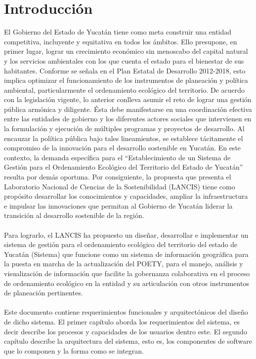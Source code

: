 \section{Introducción}

El Gobierno del Estado de Yucatán tiene como meta construir una entidad competitiva, incluyente
y equitativa en todos los ámbitos. Ello presupone, en primer lugar, lograr un crecimiento
económico sin menoscabo del capital natural y los servicios ambientales con los que cuenta el
estado para el bienestar de sus habitantes. Conforme se señala en el Plan Estatal de Desarrollo
2012-2018, esto implica optimizar el funcionamiento de los instrumentos de planeación y política
ambiental, particularmente el ordenamiento ecológico del territorio. De acuerdo con la legislación
vigente, lo anterior conlleva asumir el reto de lograr una gestión pública armónica y diligente. Ésta
debe manifestarse en una coordinación efectiva entre las entidades de gobierno y los diferentes
actores sociales que intervienen en la formulación y ejecución de múltiples programas y proyectos
de desarrollo. Al encauzar la política pública bajo tales lineamientos, se establece tácitamente el
compromiso de la innovación para el desarrollo sostenible en Yucatán.  En este contexto, la
demanda específica para el “Establecimiento de un Sistema de Gestión para el Ordenamiento
Ecológico del Territorio del Estado de Yucatán” resulta por demás oportuna. Por consiguiente, la
propuesta que presenta el Laboratorio Nacional de Ciencias de la Sostenibilidad (LANCIS) tiene
como propósito desarrollar los conocimientos y capacidades, ampliar la infraestructura e impulsar
las innovaciones que permitan al Gobierno de Yucatán liderar la transición al desarrollo sostenible
de la región. \\
\\

Para lograrlo, el LANCIS ha propuesto un diseñar, desarrollar e implementar un sistema de gestión para el ordenamiento ecológico del
territorio del estado de Yucatán (Sistema) que funcione como un sistema de información
geográfica para la puesta en marcha de la actualización del POETY, para el manejo, análisis y
visualización de información que facilite la gobernanza colaborativa en el proceso de
ordenamiento ecológico en la entidad y su articulación con otros instrumentos de planeación
pertinentes.\\
\\

Este documento contiene requerimientos funcionales y arquitectónicos del diseño de dicho sistema. El primer capítulo aborda los requerimientos del sistema, es decir describe los procesos
y capacidades de los usuarios dentro este. El segundo capítulo describe la arquitectura del sistema, esto es, los componentes de software que lo componen y la forma como se integran.
\\
